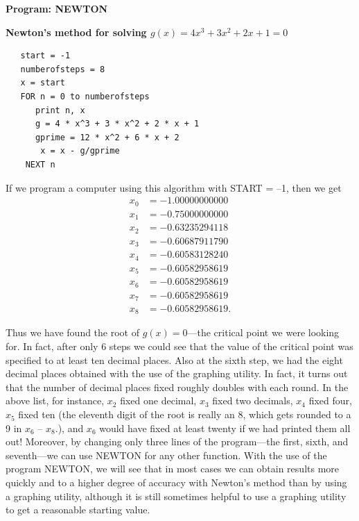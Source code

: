 \begin{center}

{\bf Program:  NEWTON}


{\bf Newton's method for solving $g(x)=4x^3 + 3x^2 +2x +1 = 0$}
\end{center}
\begin{verbatim}
   start = -1
   numberofsteps = 8
   x = start    
   FOR n = 0 to numberofsteps   
      print n, x
      g = 4 * x^3 + 3 * x^2 + 2 * x + 1
      gprime = 12 * x^2 + 6 * x + 2
       x = x - g/gprime
    NEXT n   
\end{verbatim}


If we program a computer using this algorithm with START = --1, then
we get
\begin{align*}
     x_0 &= -1.00000000000  \\
     x_1 &= -0.75000000000  \\
     x_2 &= -0.63235294118  \\
     x_3 &= -0.60687911790  \\
     x_4 &= -0.60583128240  \\
     x_5 &= -0.60582958619  \\
     x_6 &= -0.60582958619  \\
     x_7 &= -0.60582958619  \\
     x_8 &= -0.60582958619.
\end{align*}

Thus we have found the root of $g(x)=0$---the critical point we were
looking for.  In fact, after only 6 steps we could see that the value
of the critical point was specified to at least ten decimal places.
Also at the sixth step, we had the eight decimal places obtained with
the use of the graphing utility.  In fact, it turns out that the
number of decimal places fixed roughly doubles with each round.  In
the above list, for instance, $x_2$ fixed one decimal, $x_3$ fixed two
decimals, $x_4$ fixed four, $x_5$ fixed ten (the eleventh digit of the
root is really an 8, which gets rounded to a 9 in $x_6$ -- $x_8$.),
and $x_6$ would have fixed at least twenty if we had printed them all
out!  Moreover, by changing only three lines of the program---the
first, sixth, and seventh---we can use NEWTON for any other function.
With the use of the program NEWTON, we will see that in most cases we
can obtain results more quickly and to a higher degree of accuracy
with Newton's method than by using a graphing utility, although it is
still sometimes helpful to use a graphing utility to get a reasonable
starting value.


